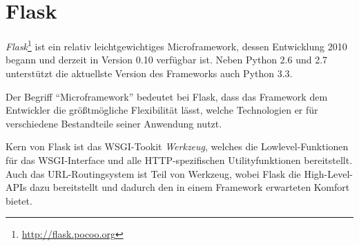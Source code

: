 \section{Flask}

\emph{Flask}\footnote{\href{http://flask.pocoo.org}{http://flask.pocoo.org}} ist ein relativ
leichtgewichtiges Microframework, dessen Entwicklung 2010 begann und derzeit in Version 0.10
verfügbar ist. Neben Python 2.6 und 2.7 unterstützt die aktuellste Version des Frameworks auch
Python 3.3.

Der Begriff \enquote{Microframework} bedeutet bei Flask, dass das Framework dem Entwickler die
größtmögliche Flexibilität lässt, welche Technologien er für verschiedene Bestandteile seiner
Anwendung nutzt.

Kern von Flask ist das WSGI-Tookit \emph{Werkzeug}, welches die Lowlevel-Funktionen für das
WSGI-Interface und alle HTTP-spezifischen Utilityfunktionen bereitstellt. Auch das URL-Routingsystem
ist Teil von Werkzeug, wobei Flask die High-Level-APIs dazu bereitstellt und dadurch den in einem
Framework erwarteten Komfort bietet.


